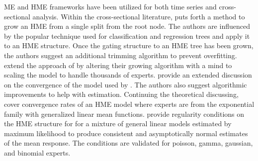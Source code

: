 \documentclass[12pt]{article}
\theoremstyle{definition}
\begin{document}
ME and HME frameworks have been utilized for both time series and
cross-sectional analysis. Within the cross-sectional literature,
\citet{WaterhouseRobinson1995} puts forth a method to grow an HME from a
single split from the root node. The authors are influenced by the popular
technique used for classification and regression trees \citep{CART1984} and 
apply it to an HME structure. Once the gating structure to an HME tree has    
been grown, the authors suggest an additional trimming algorithm to prevent overfitting.
\citet{FFW1997} extend the approach of \citet{WaterhouseRobinson1995} by altering their
growing algorithm with a mind to scaling the model to handle thousands of
experts. \citet{JordanXuConverge1995} provide an extended discussion on the convergence of the
model used by \citet{JordanJacobs1993}. The authors also suggest
algorithmic improvements to help with estimation. Continuing the theoretical
discussing, \citet{JiangTanner1999} cover convergence rates of an HME model where experts
are from the exponential family with generalized linear mean functions.
\citet{JiangTanner2000} provide regularity conditions on the HME structure for
for a mixture of general linear models estimated by maximum likelihood to
produce consistent and asymptotically normal estimates of the mean response.
The conditions are validated for poisson, gamma, gaussian, and binomial experts.

\bigskip
\end{document}
